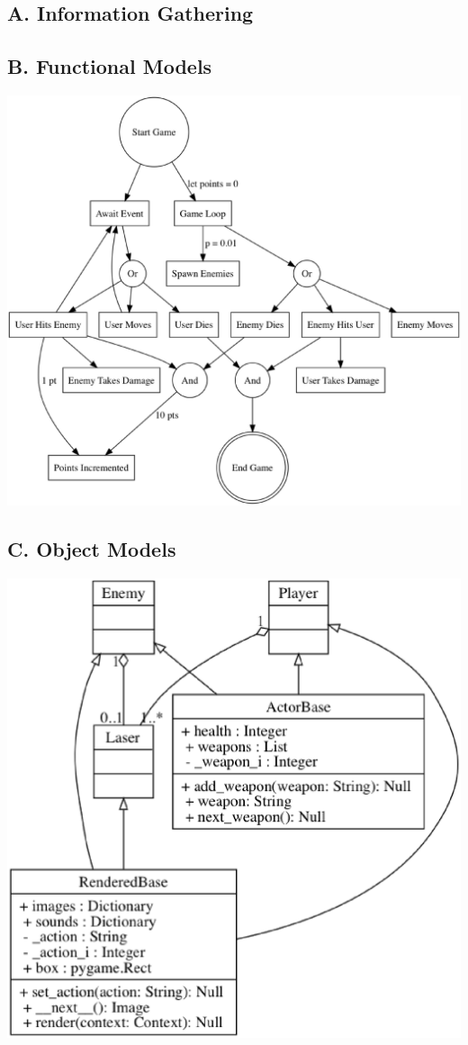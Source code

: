 %

\subsection*{A. Information Gathering}

\subsection*{B. Functional Models}
    \includegraphics{../assets/functional_models}

\subsection*{C. Object Models}
    \includegraphics{../assets/object_models}

